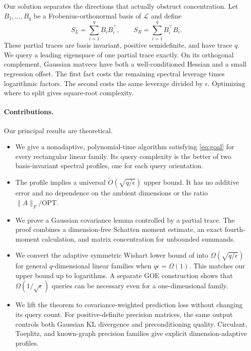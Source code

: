 \documentclass[twoside]{article}
\newcommand{\cL}{\mathcal L}
\newcommand{\OPT}{\mathrm{OPT}}
\begin{document}
Our solution separates the directions that actually obstruct concentration. Let $B_1,\ldots,B_q$ be a Frobenius-orthonormal basis of $\cL$ and define
\begin{equation}
 S_L=\sum_{i=1}^q B_iB_i^\top,
 \qquad
 S_R=\sum_{i=1}^q B_i^\top B_i.
 \label{eq:partial-traces}
\end{equation}
These partial traces are basis invariant, positive semidefinite, and have trace $q$. We query a leading eigenspace of one partial trace exactly. On its orthogonal complement, Gaussian matvecs have both a well-conditioned Hessian and a small regression offset. The first fact costs the remaining spectral leverage times logarithmic factors. The second costs the same leverage divided by $\epsilon$. Optimizing where to split gives square-root complexity.

\paragraph{Contributions.}
Our principal results are theoretical.
\begin{itemize}
\item We give a nonadaptive, polynomial-time algorithm satisfying
\eqref{eq:goal} for every rectangular linear family. Its query complexity is the better of two basis-invariant spectral profiles, one for each query orientation.

\item The profile implies a universal
$\widetilde O(\sqrt{q/\epsilon})$ upper bound. It has no additive error and no dependence on the ambient dimensions or the ratio $\|A\|_F/\OPT$.

\item We prove a Gaussian covariance lemma controlled by a partial trace. The
proof combines a dimension-free Schatten moment estimate, an exact fourth-moment calculation, and matrix concentration for unbounded summands.

\item We convert the adaptive symmetric Wishart lower bound of
\citet{amsel2026fixed} into $\Omega(\sqrt{q/\epsilon})$ for general $q$-dimensional linear families when $q\epsilon=\Omega(1)$. This matches our upper bound up to logarithms. A separate GOE construction shows that $\Omega(1/\sqrt\epsilon)$ queries can be necessary even for a one-dimensional family.

\item We lift the theorem to covariance-weighted prediction loss without
changing its query count. For positive-definite precision matrices, the same output controls both Gaussian KL divergence and preconditioning quality. Circulant, Toeplitz, and known-graph precision families give explicit dimension-adaptive profiles.
\end{itemize}
\end{document}

